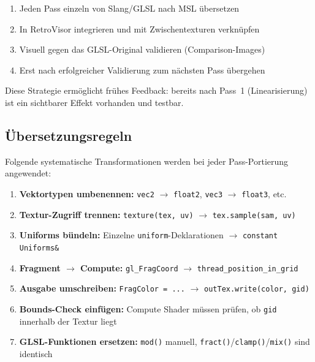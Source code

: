\documentclass[11pt, a4paper]{article}
\begin{document}
\begin{enumerate}[nosep]
    \item Jeden Pass einzeln von Slang/GLSL nach MSL \"ubersetzen \\
    \item In RetroVisor integrieren und mit Zwischentexturen verkn\"upfen \\
    \item Visuell gegen das GLSL-Original validieren (Comparison-Images) \\
    \item Erst nach erfolgreicher Validierung zum n\"achsten Pass \"ubergehen
\end{enumerate}
\vspace{.25cm}
Diese Strategie erm\"oglicht fr\"uhes Feedback: bereits nach Pass~1 (Linearisierung) ist ein sichtbarer Effekt vorhanden und testbar.

\vspace{.125cm}
\subsection{\"Ubersetzungsregeln}
\vspace{.25cm}
Folgende systematische Transformationen werden bei jeder Pass-Portierung angewendet:
\vspace{.125cm}
\begin{enumerate}[nosep]
    \item \textbf{Vektortypen umbenennen:} \texttt{vec2} $\rightarrow$ \texttt{float2}, \texttt{vec3} $\rightarrow$ \texttt{float3}, etc. \\
    \item \textbf{Textur-Zugriff trennen:} \texttt{texture(tex, uv)} $\rightarrow$ \texttt{tex.sample(sam, uv)} \\
    \item \textbf{Uniforms b\"undeln:} Einzelne \texttt{uniform}-Deklarationen $\rightarrow$ \texttt{constant Uniforms\&} \\
    \item \textbf{Fragment $\rightarrow$ Compute:} \texttt{gl\_FragCoord} $\rightarrow$ \texttt{thread\_position\_in\_grid} \\
    \item \textbf{Ausgabe umschreiben:} \texttt{FragColor = ...} $\rightarrow$ \texttt{outTex.write(color, gid)} \\
    \item \textbf{Bounds-Check einf\"ugen:} Compute Shader m\"ussen pr\"ufen, \newline ob \texttt{gid} innerhalb der Textur liegt \\
    \item \textbf{GLSL-Funktionen ersetzen:} \texttt{mod()} manuell, \texttt{fract()}/\texttt{clamp()}/\texttt{mix()} sind identisch
\end{enumerate}
\end{document}
